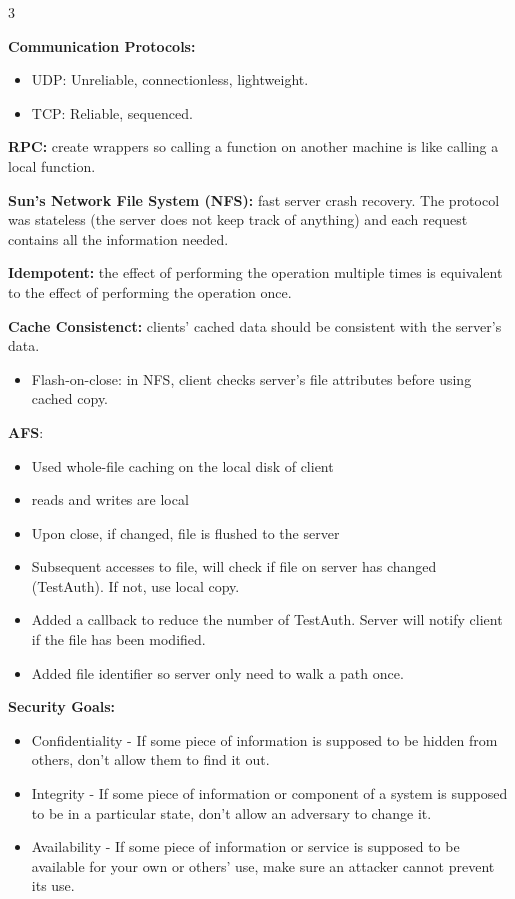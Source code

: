 \documentclass[8pt]{innovativeinnovation-cheatsheet}
\begin{document}
\begin{multicols*}{3}

\textbf{Communication Protocols:}
\begin{itemize}
      \item UDP: Unreliable, connectionless, lightweight.
      \item TCP: Reliable, sequenced.
\end{itemize}

\textbf{RPC: } create wrappers so calling a function on another machine is like calling a local function.

\textbf{Sun's Network File System (NFS):} fast server crash recovery. The protocol was stateless (the server does not keep track of anything) and each request contains all the information needed. 

\textbf{Idempotent: } the effect of performing the operation multiple times is equivalent to the effect of performing the operation once.

\textbf{Cache Consistenct:} clients' cached data should be consistent with the server's data.
\begin{itemize}
      \item Flash-on-close: in NFS, client checks server's file attributes before using cached copy.
\end{itemize}

\textbf{AFS}: 
\begin{itemize}
      \item Used whole-file caching on the local disk of client
      \item reads and writes are local
      \item Upon close, if changed, file is flushed to the server
      \item Subsequent accesses to file, will check if file on server has changed (TestAuth). If not, use local copy.
      \item Added a callback to reduce the number of TestAuth. Server will notify client if the file has been modified.
      \item Added file identifier so server only need to walk a path once.
\end{itemize}


\textbf{Security Goals:}
\begin{itemize}
      \item Confidentiality - If some piece of information is supposed to be hidden from others, don't allow them to find it out.
      \item Integrity - If some piece of information or component of a system is supposed to be in a particular state, don't allow an adversary to change it. 
      \item Availability - If some piece of information or service is supposed to be available for your own or others' use, make sure an attacker cannot prevent its use.
\end{itemize}


\end{multicols*}
\end{document}
